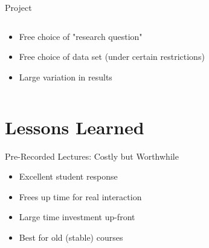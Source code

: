 \begin{frame}{Project}
  \begin{columns}[c,onlytextwidth]
    \begin{column}{0.8\linewidth}
      \begin{itemize}
        \item Free choice of "research question"
        \item Free choice of data set (under certain restrictions)
        \item Large variation in results
      \end{itemize}
    \end{column}
    \begin{column}{0.2\linewidth}
    \end{column}
  \end{columns}
\end{frame}

\section{Lessons Learned}

\begin{frame}{Pre-Recorded Lectures: Costly but Worthwhile}
  \begin{itemize}
    \item Excellent student response
    \item Frees up time for real interaction
    \item Large time investment up-front
    \item Best for old (stable) courses
  \end{itemize}
\end{frame}

